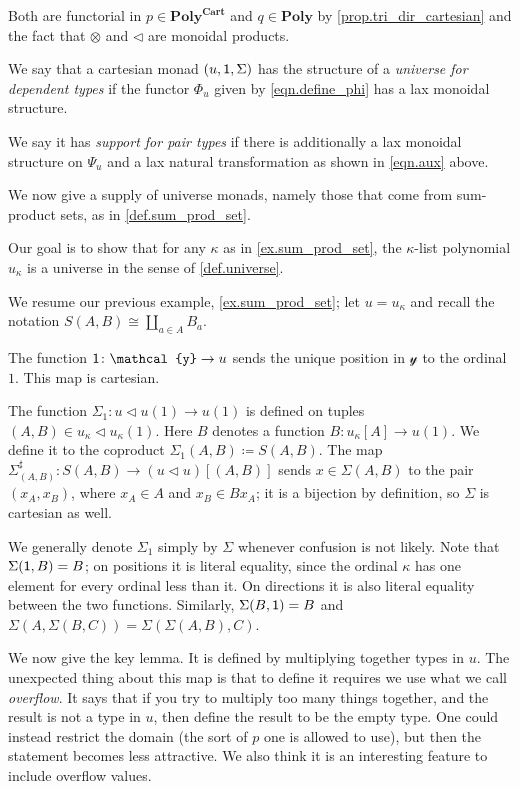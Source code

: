 \documentclass[11pt, one side, article]{memoir}
\theoremstyle{definition}
\theoremstyle{plain}
\newenvironment{example}
  {\pushQED{\qed}\renewcommand{\qedsymbol}{$\lozenge$}\examplex}
  {\popQED\endexamplex}
\newenvironment{definition}
  {\pushQED{\qed}\renewcommand{\qedsymbol}{$\lozenge$}\definitionx}
  {\popQED\enddefinitionx}
\newcommand{\Cat}[1]{\mathbf{#1}}%
\newcommand{\yon}{\mathcal{y}}
\newcommand{\poly}{\Cat{Poly}}
\newcommand{\polycart}{\poly^{\Cat{Cart}}}
\newcommand{\0}{\textsf{0}}
\newcommand{\1}{\tn{\textsf{1}}}
\newcommand{\tri}{\mathbin{\triangleleft}}
\begin{document}
Both are functorial in $p\in\polycart$ and $q\in\poly$ by \cref{prop.tri_dir_cartesian} and the fact that $\otimes$ and $\tri$ are monoidal products.

\begin{definition}[Universe monads]\label{def.universe}
We say that a cartesian monad $(u,\1,\Sigma)$ has the structure of a \emph{universe for dependent types} if the functor $\Phi_u$ given by \eqref{eqn.define_phi} has a lax monoidal structure. 

We say it has \emph{support for pair types} if there is additionally a lax monoidal structure on $\Psi_u$ and a lax natural transformation as shown in \eqref{eqn.aux} above.
\end{definition}

We now give a supply of universe monads, namely those that come from sum-product sets, as in \cref{def.sum_prod_set}.

Our goal is to show that for any $\kappa$ as in \cref{ex.sum_prod_set}, the $\kappa$-list polynomial $u_\kappa$ is a universe in the sense of \cref{def.universe}.

\begin{example}
We resume our previous example, \cref{ex.sum_prod_set}; let $u=u_\kappa$ and recall the notation $S(A,B)\cong\coprod_{a\in A}B_a$.

The function $\1\colon\yon\to u$ sends the unique position in $\yon$ to the ordinal $1$. This map is cartesian. 

The function $\Sigma_1\colon u\tri u(1)\to u(1)$ is defined on tuples $(A,B)\in u_\kappa\tri u_\kappa(1)$. Here $B$ denotes a function $B\colon u_\kappa[A]\to u(1)$. We define it to the coproduct $\Sigma_1(A,B)\coloneqq S(A,B)$. The map $\Sigma_{(A,B)}^\sharp\colon S(A,B)\to (u\tri u)[(A,B)]$ sends $x\in \Sigma(A,B)$ to the pair $(x_A,x_B)$, where $x_A\in A$ and $x_B\in B x_A$; it is a bijection by definition, so $\Sigma$ is cartesian as well.

We generally denote $\Sigma_1$ simply by $\Sigma$ whenever confusion is not likely. Note that $\Sigma(\1,B)=B$; on positions it is literal equality, since the ordinal $\kappa$ has one element for every ordinal less than it. On directions it is also literal equality between the two functions. Similarly, $\Sigma(B,\1)=B$ and $\Sigma(A,\Sigma(B,C))=\Sigma(\Sigma(A,B),C)$. 
\end{example}

We now give the key lemma. It is defined by multiplying together types in $u$. The unexpected thing about this map is that to define it requires we use what we call \emph{overflow}. It says that if you try to multiply too many things together, and the result is not a type in $u$, then define the result to be the empty type. One could instead restrict the domain (the sort of $p$ one is allowed to use), but then the statement becomes less attractive. We also think it is an interesting feature to include overflow values.
\end{document}
